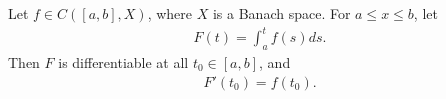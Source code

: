 %
%
%
%
%
%
%
%
\begin{lemma}
Let $f \in C\left( [a,b], X \right)$, where $X$ is a Banach space. For $a \le x
\le b$, let
%
%
\begin{equation*}
\begin{split}
  F(t) = \int_{a}^{t}f(s)ds.
\end{split}
\end{equation*}
%
%
Then $F$ is differentiable at all $t_{0} \in [a,b]$, and
%
%
\begin{equation}
  \label{fund-thm-calc-diff}
\begin{split}
  F'(t_{0})= f(t_{0}).
\end{split}
\end{equation}
\label{lem:fund-thm-calc}
\end{lemma}
%
%
%
%
